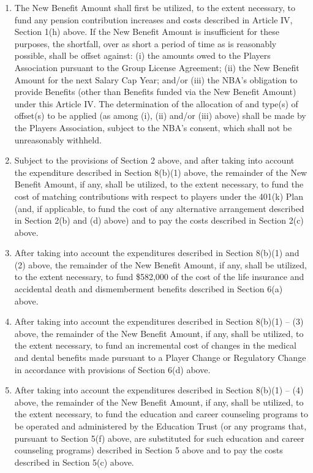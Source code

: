 \documentclass[
]{book}
\providecommand{\tightlist}{%
  \setlength{\itemsep}{0pt}\setlength{\parskip}{0pt}}
\begin{document}
\begin{enumerate}
  \begin{enumerate}
  \def\labelenumii{(\arabic{enumii})}
  \tightlist
  \item
    The New Benefit Amount shall first be utilized, to the extent necessary, to fund any pension contribution increases and costs described in Article IV, Section 1(h) above. If the New Benefit Amount is insufficient for these purposes, the shortfall, over as short a period of time as is reasonably possible, shall be offset against: (i) the amounts owed to the Players Association pursuant to the Group License Agreement; (ii) the New Benefit Amount for the next Salary Cap Year; and/or (iii) the NBA's obligation to provide Benefits (other than Benefits funded via the New Benefit Amount) under this Article IV. The determination of the allocation of and type(s) of offset(s) to be applied (as among (i), (ii) and/or (iii) above) shall be made by the Players Association, subject to the NBA's consent, which shall not be unreasonably withheld.
  \item
    Subject to the provisions of Section 2 above, and after taking into account the expenditure described in Section 8(b)(1) above, the remainder of the New Benefit Amount, if any, shall be utilized, to the extent necessary, to fund the cost of matching contributions with respect to players under the 401(k) Plan (and, if applicable, to fund the cost of any alternative arrangement described in Section 2(b) and (d) above) and to pay the costs described in Section 2(c) above.
  \item
    After taking into account the expenditures described in Section 8(b)(1) and (2) above, the remainder of the New Benefit Amount, if any, shall be utilized, to the extent necessary, to fund \$582,000 of the cost of the life insurance and accidental death and dismemberment benefits described in Section 6(a) above.
  \item
    After taking into account the expenditures described in Section 8(b)(1) -- (3) above, the remainder of the New Benefit Amount, if any, shall be utilized, to the extent necessary, to fund an incremental cost of changes in the medical and dental benefits made pursuant to a Player Change or Regulatory Change in accordance with provisions of Section 6(d) above.
  \item
    After taking into account the expenditures described in Section 8(b)(1) -- (4) above, the remainder of the New Benefit Amount, if any, shall be utilized, to the extent necessary, to fund the education and career counseling programs to be operated and administered by the Education Trust (or any programs that, pursuant to Section 5(f) above, are substituted for such education and career counseling programs) described in Section 5 above and to pay the costs described in Section 5(c) above.

\end{enumerate}
\end{enumerate}
\end{document}
